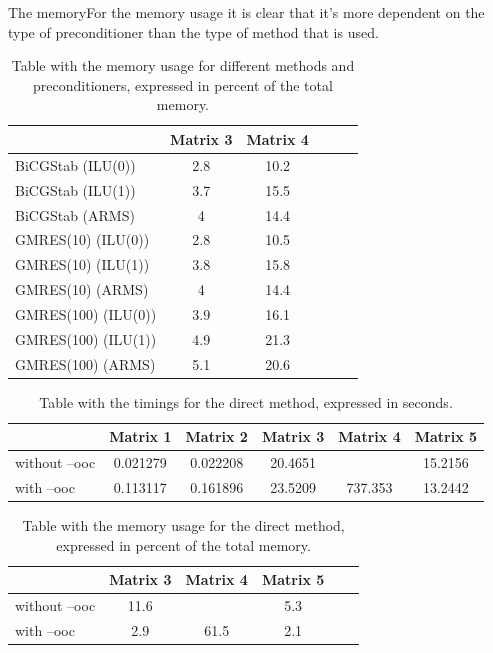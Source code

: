 \documentclass{article}
\begin{document}
	The memoryFor the memory usage it is clear that it's more dependent on the type of preconditioner than the type of method that is used. 
	
	\begin{table}[h]
		\centering
		\begin{tabular}{|l|c|c|c|c|c|}
			\hline
				 & Matrix 3 & Matrix 4 \\ \hline 
			BiCGStab (ILU(0)) & 2.8 & 10.2  \\ \hline
			BiCGStab (ILU(1)) & 3.7 & 15.5  \\ \hline
			BiCGStab (ARMS)  & 4 & 14.4 \\ \hline
			GMRES(10) (ILU(0)) &  2.8 & 10.5 \\ \hline
			GMRES(10) (ILU(1)) & 3.8 & 15.8 \\ \hline
			GMRES(10) (ARMS) & 4 & 14.4 \\ \hline
			GMRES(100) (ILU(0)) & 3.9 & 16.1 \\ \hline
			GMRES(100) (ILU(1)) & 4.9 & 21.3 \\ \hline
			GMRES(100) (ARMS) & 5.1 & 20.6 \\ \hline
		\end{tabular}
		\caption{Table with the memory usage for different methods and preconditioners, expressed in percent of the total memory.}
	\end{table}
	
	\begin{table}[h]
		\centering
		\begin{tabular}{|l|c|c|c|c|c|}
			\hline
						& Matrix 1 & Matrix 2 & Matrix 3 & Matrix 4 & Matrix 5 \\ \hline 
			without --ooc & 0.021279 & 0.022208 & 20.4651 &   & 15.2156 \\ \hline
			with --ooc & 0.113117 & 0.161896 & 23.5209 & 737.353 & 13.2442 \\ \hline
		\end{tabular}
		\caption{Table with the timings for the direct method, expressed in seconds.}
	\end{table}
	
	\begin{table}[h]
		\centering
		\begin{tabular}{|l|c|c|c|c|c|}
			\hline
			&  Matrix 3 & Matrix 4 & Matrix 5 \\ \hline 
			without --ooc & 11.6 &  & 5.3 \\ \hline
			with --ooc & 2.9 & 61.5 & 2.1 \\ \hline
		\end{tabular}
		\caption{Table with the memory usage for the direct method, expressed in percent of the total memory.}
	\end{table}
	
\end{document}
